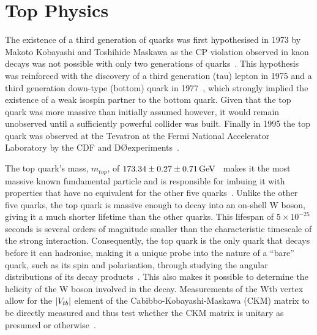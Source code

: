 %
%


%



\section{Top Physics}\label{sec:top-physics}
The existence of a third generation of quarks was first hypothesised in 1973 by Makoto Kobayashi and Toshihide Maskawa as the CP violation observed in kaon decays was not possible with only two generations of quarks~\cite{Kobayashi:1973fv}.
This hypothesis was reinforced with the discovery of a third generation (tau) lepton in 1975 and a third generation down-type (bottom) quark in 1977~\cite{Herb:1977ek}, which strongly implied the existence of a weak isospin partner to the bottom quark.
Given that the top quark was more massive than initially assumed however, it would remain unobserved until a sufficiently powerful collider was built.
Finally in 1995 the top quark was observed at the Tevatron at the Fermi National Accelerator Laboratory by the CDF and D\O  experiments~\cite{Abe:1995hr,D0:1995jca}.

The top quark's mass, $m_{top}$, of $173.34 \pm 0.27 \pm 0.71 \,\text{Ge\hspace{-.08em}V}$~\cite{Tanabashi:2018oca} makes it the most massive known fundamental particle and is responsible for imbuing it with properties that have no equivalent for the other five quarks~\cite{Tanabashi:2018oca}.
Unlike the other five quarks, the top quark is massive enough to decay into an on-shell W boson, giving it a much shorter lifetime than the other quarks.
This lifespan of $5 \times 10^{-25}$ seconds is several orders of magnitude smaller than the characteristic timescale of the strong interaction.
Consequently, the top quark is the only quark that decays before it can hadronise, making it a unique probe into the nature of a ``bare'' quark, such as its spin and polarisation, through studying the angular distributions of its decay products~\cite{Khachatryan:2015dzz}.
This also makes it possible to determine the helicity of the W boson involved in the decay.
Measurements of the Wtb vertex allow for the $\lvert V_{tb} \rvert$ element of the Cabibbo-Kobayashi-Maskawa (CKM) matrix to be directly measured and thus test whether the CKM matrix is unitary as presumed or otherwise~\cite{Shibata:2008sy}.

